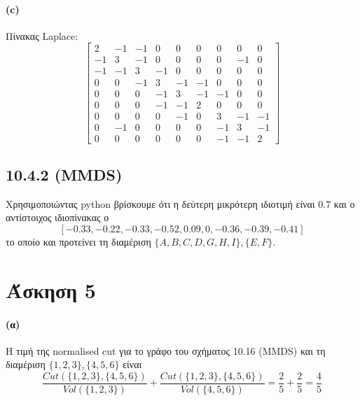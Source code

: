 \documentclass[a4paper,11pt]{article}
\begin{document}
\paragraph{(c)} Πίνακας Laplace:
\[
	\begin{bmatrix}
		2 & -1 & -1 & 0 & 0 & 0 & 0 & 0 & 0 \\
		-1 & 3 & -1 & 0 & 0 & 0 & 0 & -1 & 0 \\
		-1 & -1 & 3 & -1 & 0 & 0 & 0 & 0 & 0 \\
		0 & 0 & -1 & 3 & -1 & -1 & 0 & 0 & 0 \\
		0 & 0 & 0 & -1 & 3 & -1 & -1 & 0 & 0 \\
		0 & 0 & 0 & -1 & -1 & 2 & 0 & 0 & 0 \\
		0 & 0 & 0 & 0 & -1 & 0 & 3 & -1 & -1 \\
		0 & -1 & 0 & 0 & 0 & 0 & -1 & 3 & -1 \\
		0 & 0 & 0 & 0 & 0 & 0 & -1 & -1 & 2
	\end{bmatrix}
\]

\subsection*{10.4.2 (MMDS)}

Χρησιμοποιώντας python βρίσκουμε ότι η δεύτερη μικρότερη ιδιοτιμή είναι $0.7$ και ο αντίστοιχος ιδιοπίνακας ο
\[[-0.33,-0.22,-0.33,-0.52,0.09,0,-0.36,-0.39,-0.41]\]
το οποίο και προτείνει τη διαμέριση $\{A,B,C,D,G,H,I\},\{E,F\}$.


\section*{Άσκηση 5}

\paragraph{(α)} Η τιμή της normalised cut για το γράφο του σχήματος 10.16 (MMDS) και τη διαμέριση $\{1,2,3\},\{4,5,6\}$ είναι
\[
	\frac{Cut(\{1,2,3\},\{4,5,6\})}{Vol(\{1,2,3\})} + \frac{Cut(\{1,2,3\},\{4,5,6\})}{Vol(\{4,5,6\})} = \frac25 + \frac25 = \frac45
\]
\end{document}
